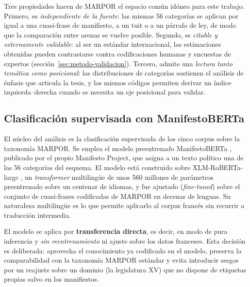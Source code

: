 Tres propiedades hacen de MARPOR el espacio común idóneo para este trabajo.
Primero, es \emph{independiente de la fuente}: las mismas 56 categorías se
aplican por igual a una cuasi-frase de manifiesto, a un tuit o a un párrafo de
ley, de modo que la comparación entre arenas se vuelve posible. Segundo, es
\emph{citable y externamente validable}: al ser un estándar internacional, las
estimaciones obtenidas pueden contrastarse contra codificaciones humanas y
encuestas de expertos (sección~\ref{sec:metodo-validacion}). Tercero, admite
una \emph{lectura tanto temática como posicional}: las distribuciones de
categorías sostienen el análisis de énfasis que articula la tesis, y los mismos
códigos permiten derivar un índice izquierda--derecha cuando se necesita un eje
posicional para validar.

\subsection{Clasificación supervisada con ManifestoBERTa}
\label{sec:metodo-manifestoberta}

El núcleo del análisis es la clasificación supervisada de los cinco corpus sobre
la taxonomía MARPOR. Se emplea el modelo preentrenado ManifestoBERTa
\cite{manifestoberta2024}, publicado por el propio Manifesto Project, que asigna
a un texto político una de las 56 categorías del esquema. El modelo está
construido sobre XLM-RoBERTa-large \cite{conneau2020xlmr}, un
\emph{transformer} multilingüe de unos 560 millones de parámetros preentrenado
sobre un centenar de idiomas, y fue ajustado (\emph{fine-tuned}) sobre el
conjunto de cuasi-frases codificadas de MARPOR en decenas de lenguas. Su
naturaleza multilingüe es lo que permite aplicarlo al corpus francés sin recurrir
a traducción intermedia.

El modelo se aplica por \textbf{transferencia directa}, es decir, en modo de pura
inferencia y \emph{sin reentrenamiento} ni ajuste sobre los datos franceses. Esta
decisión es deliberada: aprovecha el conocimiento ya codificado en el modelo,
preserva la comparabilidad con la taxonomía MARPOR estándar y evita introducir
sesgos por un reajuste sobre un dominio (la legislatura XV) que no dispone de
etiquetas propias salvo en los manifiestos.

